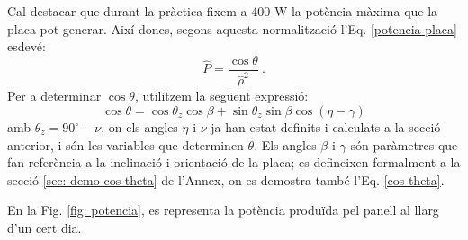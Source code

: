 \documentclass[11pt]{article}
\begin{document}
Cal destacar que durant la pràctica fixem a 400 W la potència màxima que la placa pot generar.
Així doncs, segons aquesta normalització l'Eq. \eqref{potencia placa} esdevé:
\begin{equation}
    \hat{P} = \frac{\cos{\theta}}{\hat{\rho}^2} \ .
    \label{pot norm}
\end{equation}
Per a determinar $\cos{\theta}$, utilitzem la següent expressió:
\begin{equation}
    \cos \theta = \cos \theta_z \cos \beta + \sin \theta_z \sin \beta \cos (\eta - \gamma)
    \label{cos theta}
\end{equation}
amb $\theta_z = 90^{\circ}-\nu$, on els angles $\eta$ i $\nu$ ja han estat definits i calculats a la secció anterior, i són les variables que determinen $\theta$. Els angles $\beta$ i $\gamma$ són paràmetres que fan referència a la inclinació i orientació de la placa; es defineixen formalment a la secció \ref{sec: demo cos theta} de l'Annex, on es demostra també l'Eq. \eqref{cos theta}.

En la Fig. \ref{fig: potencia}, es representa la potència produïda pel panell al llarg d'un cert dia.
\end{document}
